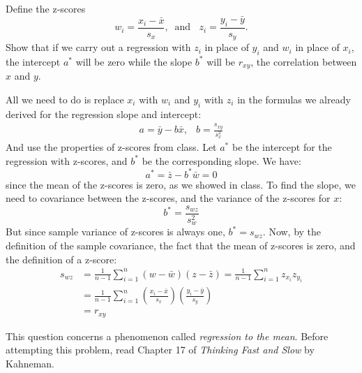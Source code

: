 \documentclass[addpoints,12pt]{exam}
\begin{document}
\begin{questions}
  \question Define the z-scores 
  \[w_i = \frac{x_i - \bar{x}}{s_x}, \;\;\mbox{and }\;\; z_i = \frac{y_i - \bar{y}}{s_y}.\]
  Show that if we carry out a regression with $z_i$ in place of $y_i$ and $w_i$ in place of $x_i$, the intercept $a^*$ will be zero while the slope $b^*$ will be $r_{xy}$, the correlation between $x$ and $y$.
    \begin{solution}
     All we need to do is replace $x_i$ with $w_i$ and $y_i$ with $z_i$ in the formulas we already derived for the regression slope and intercept:
     		$$\begin{array}{lr}a = \bar{y} - b\bar{x}, & b = \displaystyle \frac{s_{xy}}{s_x^2}\end{array}$$
     		And use the properties of z-scores from class. Let $a^*$ be the intercept for the regression with z-scores, and $b^*$ be the corresponding slope. We have:
        $$a^* = \bar{z} - b^* \bar{w} = 0$$
     	 	since the mean of the z-scores is zero, as we showed in class. To find the slope, we need to covariance between the z-scores, and the variance of the z-scores for $x$:
     	 		$$b^* = \frac{s_{wz}}{s_{w}^2}$$
     	 		But since sample variance of z-scores is always one, $b^* = s_{wz}$. Now, by the definition of the sample covariance, the fact that the mean of z-scores is zero, and the definition of a z-score:
     	 		\begin{align*}
     	 		s_{wz} &= \frac{1}{n-1} \sum_{i=1}^n (w - \bar{w})(z - \bar{z}) = \frac{1}{n-1} \sum_{i=1}^n z_{x_i}z_{y_i}\\
     	 		&= \frac{1}{n-1} \sum_{i=1}^n \left(\frac{x_i - \bar{x}}{s_x}\right)\left(\frac{y_i - \bar{y}}{s_y}\right)\\
     	 		&= r_{xy}
     	 		\end{align*}
    \end{solution}

  \question This question concerns a phenomenon called \emph{regression to the mean}. Before attempting this problem, read Chapter 17 of \emph{Thinking Fast and Slow} by Kahneman.
  \begin{parts}

\end{parts}
\end{questions}
\end{document}
